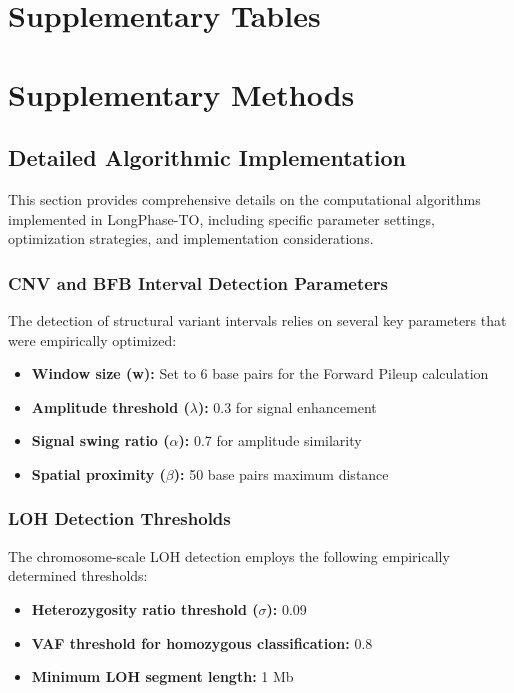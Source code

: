 \documentclass[pdflatex,sn-nature]{sn-jnl}
\begin{document}
\section{Supplementary Tables}

\section{Supplementary Methods}

\subsection{Detailed Algorithmic Implementation}

This section provides comprehensive details on the computational algorithms implemented in LongPhase-TO, including specific parameter settings, optimization strategies, and implementation considerations.

\subsubsection{CNV and BFB Interval Detection Parameters}

The detection of structural variant intervals relies on several key parameters that were empirically optimized:

\begin{itemize}
\item \textbf{Window size (w):} Set to 6 base pairs for the Forward Pileup calculation
\item \textbf{Amplitude threshold ($\lambda$):} 0.3 for signal enhancement
\item \textbf{Signal swing ratio ($\alpha$):} 0.7 for amplitude similarity
\item \textbf{Spatial proximity ($\beta$):} 50 base pairs maximum distance
\end{itemize}

\subsubsection{LOH Detection Thresholds}

The chromosome-scale LOH detection employs the following empirically determined thresholds:

\begin{itemize}
\item \textbf{Heterozygosity ratio threshold ($\sigma$):} 0.09
\item \textbf{VAF threshold for homozygous classification:} 0.8
\item \textbf{Minimum LOH segment length:} 1 Mb
\end{itemize}
\end{document}
